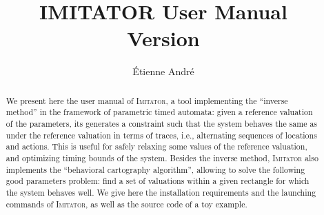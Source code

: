 \documentclass[a4paper,10pt]{article}
\title{IMITATOR User Manual\\{\Large Version \imitatorversion{}}}
\author{\'Etienne Andr\'e}
\newcommand{\imitator}{\textsc{Imitator}}
\begin{document}
\maketitle







\begin{abstract}
We present here the user manual of \imitator{}, a tool implementing the ``inverse method'' in the framework of parametric timed automata:
given a reference valuation of the parameters, its generates a constraint such that the system behaves the same as under the reference valuation in terms of traces, i.e., alternating sequences of locations and actions.
This is useful for safely relaxing some values of the reference valuation, and optimizing timing bounds of the system.
Besides the inverse method, \imitator{} also implements the ``behavioral cartography algorithm'', allowing to solve the following good parameters problem: find a set of valuations within a given rectangle for which the system behaves well.
We give here the installation requirements and the launching commands of \imitator{}, as well as the source code of a toy example.
\end{abstract}

\newpage
\tableofcontents
\newpage

\pagestyle{fancyplain}
\end{document}
